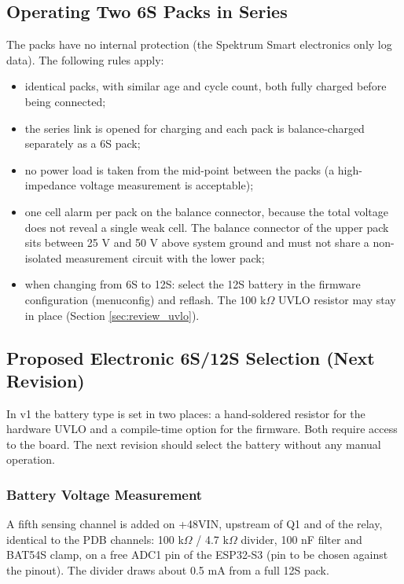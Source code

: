 \documentclass[11pt,a4paper]{article}
\begin{document}
\subsection{Operating Two 6S Packs in Series}

The packs have no internal protection (the Spektrum Smart electronics only log data). The following rules apply:
\begin{itemize}
    \item identical packs, with similar age and cycle count, both fully charged before being connected;
    \item the series link is opened for charging and each pack is balance-charged separately as a 6S pack;
    \item no power load is taken from the mid-point between the packs (a high-impedance voltage measurement is acceptable);
    \item one cell alarm per pack on the balance connector, because the total voltage does not reveal a single weak cell. The balance connector of the upper pack sits between 25 V and 50 V above system ground and must not share a non-isolated measurement circuit with the lower pack;
    \item when changing from 6S to 12S: select the 12S battery in the firmware configuration (menuconfig) and reflash. The 100 k$\Omega$ UVLO resistor may stay in place (Section \ref{sec:review_uvlo}).
\end{itemize}

\subsection{Proposed Electronic 6S/12S Selection (Next Revision)}
\label{sec:review_autodetect}

In v1 the battery type is set in two places: a hand-soldered resistor for the hardware UVLO and a compile-time option for the firmware. Both require access to the board. The next revision should select the battery without any manual operation.

\subsubsection{Battery Voltage Measurement}
A fifth sensing channel is added on +48VIN, upstream of Q1 and of the relay, identical to the PDB channels: 100 k$\Omega$ / 4.7 k$\Omega$ divider, 100 nF filter and BAT54S clamp, on a free ADC1 pin of the ESP32-S3 (pin to be chosen against the pinout). The divider draws about 0.5 mA from a full 12S pack.
\end{document}
